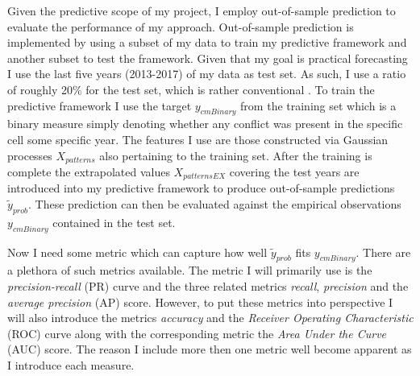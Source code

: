 \documentclass[a4paper]{article}
\begin{document}

Given the predictive scope of my project, I employ out-of-sample prediction to evaluate the performance of my approach. Out-of-sample prediction is implemented by using a subset of my data to train my predictive framework and another subset to test the framework. Given that my goal is practical forecasting I use the last five years (2013-2017) of my data as test set. As such, I use a ratio of roughly 20\% for the test set, which is rather conventional \citep{Friedman_2001, Ward_Greenhill_Bakke_2010}. To train the predictive framework I use the target $y_{cmBinary}$ from the training set which is a binary measure simply denoting whether any conflict was present in the specific cell some specific year. The features I use are those constructed via Gaussian processes $X_{patterns}$ also pertaining to the training set. After the training is complete the extrapolated values $X_{patternsEX}$ covering the test years are introduced into my predictive framework to produce out-of-sample predictions $\tilde{y}_{prob}$. These prediction can then be evaluated against the empirical observations $y_{cmBinary}$ contained in the test set.\par

Now I need some metric which can capture how well  $\tilde{y}_{prob}$ fits $y_{cmBinary}$. There are a plethora of such metrics available. The metric I will primarily use is the \emph{precision-recall} (PR) curve and the three related metrics \emph{recall}, \emph{precision} and the \emph{average precision} (AP) score. However, to put these metrics into perspective I will also introduce the metrics \emph{accuracy} and the \emph{Receiver Operating Characteristic} (ROC) curve along with the corresponding metric the \emph{Area Under the Curve} (AUC) score. The reason I include more then one metric well become apparent as I introduce each measure.\par
\end{document}
